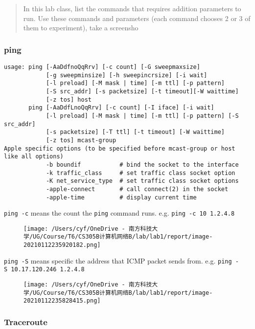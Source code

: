 \documentclass[
]{article}
\begin{document}
\begin{quote}
In this lab class, list the commands that requires addition parameters
to run. Use these commands and parameters (each command chooses 2 or 3
of them to experiment), take a screensho
\end{quote}

\hypertarget{header-n48}{%
\subsubsection{ping}\label{header-n48}}

\begin{verbatim}
usage: ping [-AaDdfnoQqRrv] [-c count] [-G sweepmaxsize]
            [-g sweepminsize] [-h sweepincrsize] [-i wait]
            [-l preload] [-M mask | time] [-m ttl] [-p pattern]
            [-S src_addr] [-s packetsize] [-t timeout][-W waittime]
            [-z tos] host
       ping [-AaDdfLnoQqRrv] [-c count] [-I iface] [-i wait]
            [-l preload] [-M mask | time] [-m ttl] [-p pattern] [-S src_addr]
            [-s packetsize] [-T ttl] [-t timeout] [-W waittime]
            [-z tos] mcast-group
Apple specific options (to be specified before mcast-group or host like all options)
            -b boundif           # bind the socket to the interface
            -k traffic_class     # set traffic class socket option
            -K net_service_type  # set traffic class socket options
            -apple-connect       # call connect(2) in the socket
            -apple-time          # display current time
\end{verbatim}

\texttt{ping\ -c} means the count the \texttt{ping} command runs. e.g.
\texttt{ping\ -c\ 10\ 1.2.4.8}

\begin{figure}
\centering
\texttt{[image: /Users/cyf/OneDrive - 南方科技大学/UG/Course/T6/CS305B计算机网络B/lab/lab1/report/image-20210112235920182.png]}
\caption{}
\end{figure}

\texttt{ping\ -S} means specific the address that ICMP packet sends
from. e.g. \texttt{ping\ -S\ 10.17.120.246\ 1.2.4.8}

\begin{figure}
\centering
\texttt{[image: /Users/cyf/OneDrive - 南方科技大学/UG/Course/T6/CS305B计算机网络B/lab/lab1/report/image-20210112235828415.png]}
\caption{}
\end{figure}

\hypertarget{header-n54}{%
\subsubsection{Traceroute}\label{header-n54}}
\end{document}
